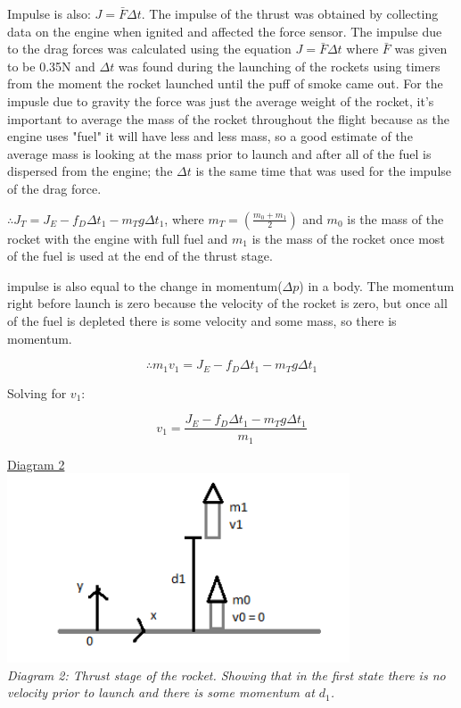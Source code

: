\documentclass[aps,letterpaper,11pt]{revtex4}
\begin{document}
Impulse is also: $J = \bar{F}\Delta t$. The impulse of the thrust was obtained by collecting data on the engine when ignited and affected the force sensor. The impulse due to the drag forces was calculated using the equation $J = \bar{F}\Delta t$ where $\bar{F}$ was given to be 0.35N and $\Delta t$ was found during the launching of the rockets using timers from the moment the rocket launched until the puff of smoke came out. For the impusle due to gravity the force was just the average weight of the rocket, it's important to average the mass of the rocket throughout the flight because as the engine uses "fuel" it will have less and less mass, so a good estimate of the average mass is looking at the mass prior to launch and after all of the fuel is dispersed from the engine; the $\Delta t$ is the same time that was used for the impulse of the drag force.

$\therefore J_T = J_E - f_D\Delta t_1 - m_Tg\Delta t_1$, where $m_T = (\frac{m_0+m_1}{2})$ and $m_0$ is the mass of the rocket with the engine with full fuel and $m_1$ is the mass of the rocket once most of the fuel is used at the end of the thrust stage.

impulse is also equal to the change in momentum($\Delta p$) in a body. The momentum right before launch is zero because the velocity of the rocket is zero, but once all of the fuel is depleted there is some velocity and some mass, so there is momentum. 

$$ \therefore m_1v_1 = J_E - f_D\Delta t_1 - m_Tg\Delta t_1$$

Solving for $v_1$:

$$ v_1 = \frac{J_E - f_D\Delta t_1 - m_Tg\Delta t_1}{m_1}$$

\begin{center}
\underline{Diagram 2}\\
\includegraphics[width = 4in]{CalculatingD1.png}\\
\textit{Diagram 2: Thrust stage of the rocket. Showing that in the first state there is no velocity prior to launch and there is some momentum at $d_1$.}
\end{center}
\end{document}
